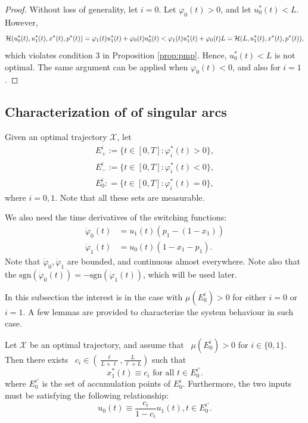 \begin{proof}
	Without loss of generality, let $i=0$.
	Let $\varphi_0(t)>0$, and let $u_0^*(t) <L$. 
	However,
	\begin{equation} 
		\footnotesize{
		\mathcal H(u_0^*(t),u_1^*(t),x^*(t),p^*(t)) = \varphi_1(t) u_1^*(t)+\varphi_0(t) u_0^*(t)<\varphi_1(t) u_1^*(t)+\varphi_0(t) L = \mathcal H(L,u_1^*(t),x^*(t),p^*(t)), 
	}
	\end{equation}
	which violates condition 3 in Proposition \ref{prop:pmp}. 
	Hence, $u_0^*(t)<L$ is not optimal. 
	The same argument can be applied when $\varphi_0(t)<0$, and also for $i=1$.
\end{proof}

\subsection{Characterization of of singular arcs}

Given an optimal trajectory $\mathscr X$, let
\begin{subequations}
	\begin{align}
	E_+^i:=\{ t \in [0,T]:  \varphi_i^*(t)>0\} , \\
	E_-^i :=\{ t \in [0,T] : \varphi_i^*(t)<0\},\\
	E_0^i : =\{ t \in [0,T] :  \varphi_i^*(t)=0\},
	\end{align}
\end{subequations}
where $i=0,1$. Note that all these  sets are measurable.

We also need the time derivatives of the switching functions:
\begin{subequations}
	\begin{align}
	\dot\varphi_0(t) &= u_1(t) ( p_1 - (1-x_1)) \label{dotphi0}\\
	\dot\varphi_1(t) &= u_0(t) (1-x_1-p_1). \label{dotphi1}
	\end{align}
\end{subequations}
Note that $\dot\varphi_0,\dot\varphi_1$ are bounded, and continuous almost everywhere. 
Note also that the $\mbox{sgn}(\dot\varphi_0(t))=-\mbox{sgn}(\dot\varphi_1(t))$, which will be used later.

In this subsection the interest is in the case with $\mu(E_0^i)>0$ for either $i=0$ or $i=1$.  
A few lemmas are provided to characterize the system behaviour in such case.

\begin{lemma}\label{l.s1}
	Let $\mathscr X$ be an optimal trajectory, and assume that  ~$\mu(E_0^i)>0$ for $i\in\{0,1\}$.
	Then there exists ~$c_i \in ( \tfrac{\ell}{L+\ell}, \tfrac L{\ell+L})$ such that 
	\begin{equation}
	x_1^*(t)\equiv  c_i \text{ for all }  t \in E_0^{i'}.
	\end{equation}
	where $E_0^{i'}$ is the set of accumulation points of $E_0^i$. 
	Furthermore, the two inputs must be satisfying the following relationship:
	\begin{equation}\label{inputs_coupled}
		u_0(t) \equiv \frac{c_i}{1-c_i}  u_1(t), t \in E_0^{i'}.
	\end{equation}
\end{lemma}

